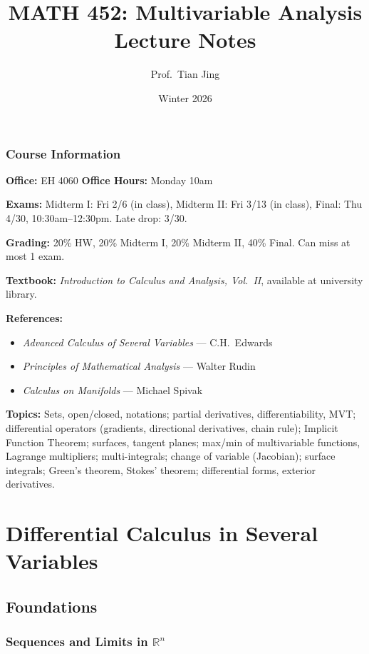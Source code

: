 \documentclass[11pt]{report}
\title{\textbf{MATH 452: Multivariable Analysis}\\Lecture Notes}
\author{Prof.\ Tian Jing}
\date{Winter 2026}
\newcommand{\R}{\mathbb{R}}
\begin{document}
\maketitle

\tableofcontents
\newpage

\section*{Course Information}
\textbf{Office:} EH 4060 \quad \textbf{Office Hours:} Monday 10am

\textbf{Exams:} Midterm I: Fri 2/6 (in class), Midterm II: Fri 3/13 (in class), Final: Thu 4/30, 10:30am--12:30pm. Late drop: 3/30.

\textbf{Grading:} 20\% HW, 20\% Midterm I, 20\% Midterm II, 40\% Final. Can miss at most 1 exam.

\textbf{Textbook:} \textit{Introduction to Calculus and Analysis, Vol.\ II}, available at university library.

\textbf{References:}
\begin{itemize}[nosep]
    \item \textit{Advanced Calculus of Several Variables} --- C.H.\ Edwards
    \item \textit{Principles of Mathematical Analysis} --- Walter Rudin
    \item \textit{Calculus on Manifolds} --- Michael Spivak
\end{itemize}

\textbf{Topics:} Sets, open/closed, notations; partial derivatives, differentiability, MVT; differential operators (gradients, directional derivatives, chain rule); Implicit Function Theorem; surfaces, tangent planes; max/min of multivariable functions, Lagrange multipliers; multi-integrals; change of variable (Jacobian); surface integrals; Green's theorem, Stokes' theorem; differential forms, exterior derivatives.

\hrulefill

\newpage
\part{Differential Calculus in Several Variables}

\chapter{Foundations}

\section{Sequences and Limits in $\R^n$}
\end{document}
